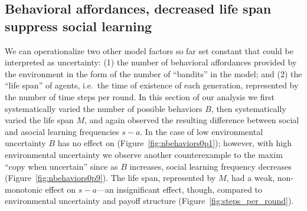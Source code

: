 \documentclass[10pt,letterpaper]{article}
\begin{document}
\subsection{Behavioral affordances, decreased life span suppress social learning}
We can operationalize two other model factors so far set constant 
that could be interpreted as uncertainty: (1) the number of behavioral affordances
provided by the environment in the form of the number of ``bandits'' in the model;
and (2) the ``life span'' of agents, i.e.\ the time of existence of each generation, 
represented by the number of time steps per round. In this section of our analysis
we first systematically varied the number of possible behaviors $B$, then 
systematically varied the life span $M$, and again observed the resulting 
difference between social and asocial learning frequencies $s - a$. In the case
of low environmental uncertainty $B$ has no effect on
(Figure~\ref{fig:nbehaviors0p1}); however, with high environmental uncertainty
we observe another counterexample to the maxim ``copy when uncertain'' since
as $B$ increases, social learning frequency decreases
(Figure~\ref{fig:nbehaviors0p9}). The life span, represented by $M$, had a weak,
non-monotonic effect on $s-a$---an insignificant effect, though, 
compared to environmental uncertainty and payoff structure
(Figure~\ref{fig:steps_per_round}).

\end{document}
